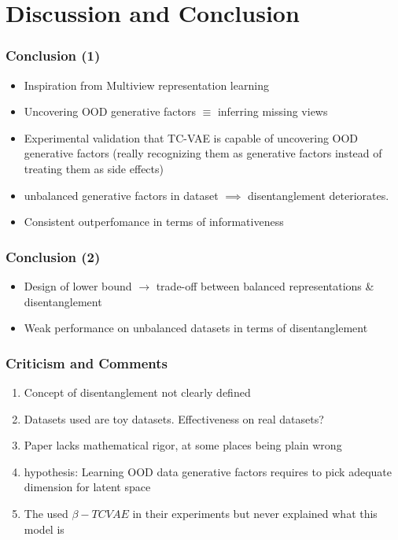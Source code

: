 \documentclass{beamer}
\theoremstyle{definition}
\begin{document}
    \section{Discussion and Conclusion}

    \begin{frame}
      \frametitle{Conclusion (1)}
      \begin{itemize}
        \item Inspiration from Multiview representation learning
        \item Uncovering OOD generative factors $\equiv$ inferring missing views
        \item Experimental validation that TC-VAE is capable of uncovering OOD generative factors (really recognizing them as generative factors instead of treating them as side effects)
        \item unbalanced generative factors in dataset $\implies$ disentanglement deteriorates.
        \item Consistent outperfomance in terms of informativeness
      \end{itemize}
    \end{frame}

    \begin{frame}
      \frametitle{Conclusion (2)}
      \begin{itemize}
        \item Design of lower bound $\to$ trade-off between balanced representations \& disentanglement
        \item Weak performance on unbalanced datasets in terms of disentanglement
      \end{itemize}
    \end{frame}

    \begin{frame}
      \frametitle{Criticism and Comments}
      \begin{enumerate}
        \item Concept of disentanglement not clearly defined
        \item Datasets used are toy datasets. Effectiveness on real datasets?
        \item Paper lacks mathematical rigor, at some places being plain wrong
        \item hypothesis: Learning OOD data generative factors requires to pick adequate dimension for latent space
        \item The used $\beta-TCVAE$ in their experiments but never explained what this model is
      \end{enumerate}
    \end{frame}
\end{document}
